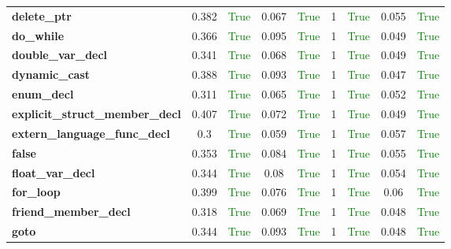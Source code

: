 \documentclass{article}
\begin{document}
\begin{xltabular}{\textwidth}{lcccccccc}
\textbf{{\fontsize{10}{12}\selectfont delete\_ptr}}& 0.382&\textcolor{green}{True}& 0.067&\textcolor{green}{True}& 1&\textcolor{green}{True}& 0.055&\textcolor{green}{True} \\[0.5ex]
\textbf{{\fontsize{10}{12}\selectfont do\_while}}& 0.366&\textcolor{green}{True}& 0.095&\textcolor{green}{True}& 1&\textcolor{green}{True}& 0.049&\textcolor{green}{True} \\[0.5ex]
\textbf{{\fontsize{10}{12}\selectfont double\_var\_decl}}& 0.341&\textcolor{green}{True}& 0.068&\textcolor{green}{True}& 1&\textcolor{green}{True}& 0.049&\textcolor{green}{True} \\[0.5ex]
\textbf{{\fontsize{10}{12}\selectfont dynamic\_cast}}& 0.388&\textcolor{green}{True}& 0.093&\textcolor{green}{True}& 1&\textcolor{green}{True}& 0.047&\textcolor{green}{True} \\[0.5ex]
\textbf{{\fontsize{10}{12}\selectfont enum\_decl}}& 0.311&\textcolor{green}{True}& 0.065&\textcolor{green}{True}& 1&\textcolor{green}{True}& 0.052&\textcolor{green}{True} \\[0.5ex]
\textbf{{\fontsize{10}{12}\selectfont explicit\_struct\_member\_decl}}& 0.407&\textcolor{green}{True}& 0.072&\textcolor{green}{True}& 1&\textcolor{green}{True}& 0.049&\textcolor{green}{True} \\[0.5ex]
\textbf{{\fontsize{10}{12}\selectfont extern\_language\_func\_decl}}& 0.3&\textcolor{green}{True}& 0.059&\textcolor{green}{True}& 1&\textcolor{green}{True}& 0.057&\textcolor{green}{True} \\[0.5ex]
\textbf{{\fontsize{10}{12}\selectfont false}}& 0.353&\textcolor{green}{True}& 0.084&\textcolor{green}{True}& 1&\textcolor{green}{True}& 0.055&\textcolor{green}{True} \\[0.5ex]
\textbf{{\fontsize{10}{12}\selectfont float\_var\_decl}}& 0.344&\textcolor{green}{True}& 0.08&\textcolor{green}{True}& 1&\textcolor{green}{True}& 0.054&\textcolor{green}{True} \\[0.5ex]
\textbf{{\fontsize{10}{12}\selectfont for\_loop}}& 0.399&\textcolor{green}{True}& 0.076&\textcolor{green}{True}& 1&\textcolor{green}{True}& 0.06&\textcolor{green}{True} \\[0.5ex]
\textbf{{\fontsize{10}{12}\selectfont friend\_member\_decl}}& 0.318&\textcolor{green}{True}& 0.069&\textcolor{green}{True}& 1&\textcolor{green}{True}& 0.048&\textcolor{green}{True} \\[0.5ex]
\textbf{{\fontsize{10}{12}\selectfont goto}}& 0.344&\textcolor{green}{True}& 0.093&\textcolor{green}{True}& 1&\textcolor{green}{True}& 0.048&\textcolor{green}{True} \\[0.5ex]

\end{xltabular}
\end{document}
